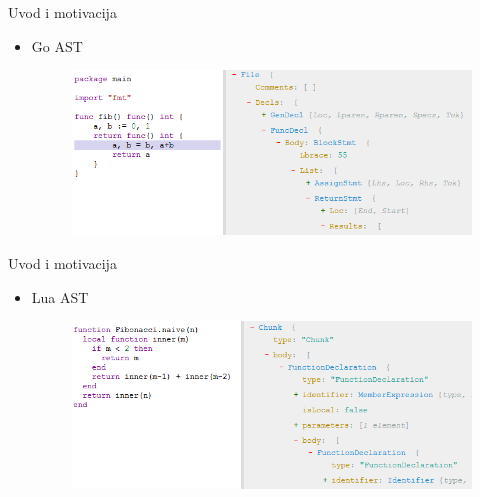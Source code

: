 \documentclass{beamer}
\begin{document}
\begin{frame}{Uvod i motivacija}
    \begin{itemize}
        \item Go AST
        \begin{figure}[h!]
            \centering
            \includegraphics[scale=0.6]{images/ast_go.PNG}
        \end{figure}
    \end{itemize}
\end{frame}

\begin{frame}{Uvod i motivacija}
    \begin{itemize}
        \item Lua AST
        \begin{figure}[h!]
            \centering
            \includegraphics[scale=0.6]{images/ast_lua.PNG}
        \end{figure}
    \end{itemize}
\end{frame}
\end{document}
